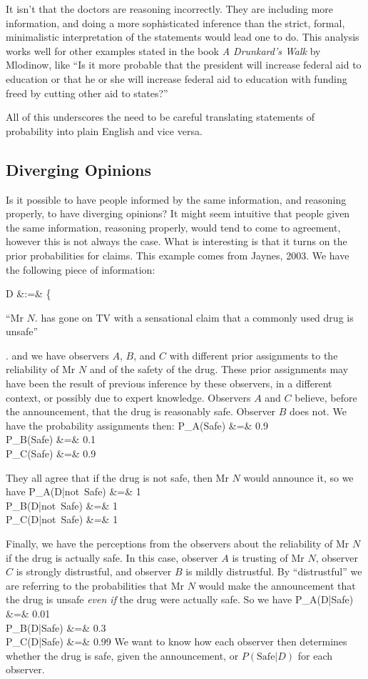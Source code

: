 It isn't that the doctors are reasoning incorrectly. They are including more information, and doing a more sophisticated inference than the strict, formal, minimalistic interpretation of the statements would lead one to do.
This analysis works well for other examples stated in the book {\em A Drunkard's Walk} by Mlodinow\citep{mlodinow2008drunkard}, like ``Is it more probable that the president will increase federal aid to education or that he or she will increase federal aid to education with funding freed by cutting other aid to states?''

All of this underscores the need to be careful translating statements of probability into plain English and vice versa.

\subsection{Diverging Opinions}

Is it possible to have people informed by the same information, and reasoning properly, to have diverging opinions?  It might seem intuitive that people given the same information, reasoning properly, would tend to come to agreement, however this is not always the case.  What is interesting is that it turns on the prior probabilities for claims.  This example comes from Jaynes, 2003\cite{Jaynes2003}.  We have the following piece of information:

\beqn
D &:=& \left\{\parbox{3in}{``Mr $N$. has gone on TV with a sensational claim that a commonly used drug is unsafe''}\right.
\eeqn
and we have observers $A$, $B$, and $C$ with different prior assignments to the reliability of Mr $N$ and of the safety of the drug.  These prior assignments may have been the result of previous inference by these observers, in a different context, or possibly due to expert knowledge.  Observers $A$ and $C$ believe, before the announcement, that the drug is reasonably safe.  Observer $B$ does not.  We have the probability assignments then:
\beqn
P_{A}({\rm Safe}) &=& 0.9 \\
P_{B}({\rm Safe}) &=& 0.1 \\
P_{C}({\rm Safe}) &=& 0.9 
\eeqn

They all agree that if the drug is not safe, then Mr $N$ would announce it, so we have
\beqn
P_{A}(D|\mbox{not Safe}) &=& 1 \\
P_{B}(D|\mbox{not Safe}) &=& 1 \\
P_{C}(D|\mbox{not Safe}) &=& 1 
\eeqn

Finally, we have the perceptions from the observers about the reliability of Mr $N$ if the drug is actually safe.  In this case, observer $A$ is trusting of Mr $N$, observer $C$ is strongly distrustful, and observer $B$ is mildly distrustful.  By ``distrustful'' we are referring to the probabilities that Mr $N$ would make the announcement that the drug is unsafe \emph{even if} the drug were actually safe.  So we have
\beqn
P_{A}(D|\mbox{Safe}) &=& 0.01 \\
P_{B}(D|\mbox{Safe}) &=& 0.3 \\
P_{C}(D|\mbox{Safe}) &=& 0.99 
\eeqn
We want to know how each observer then determines whether the drug is safe, given the announcement, or $P(\mbox{Safe}|D)$ for each observer.

